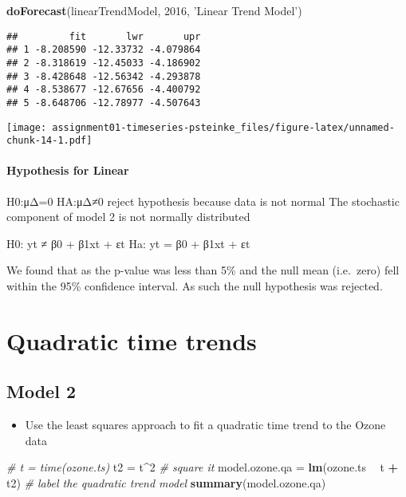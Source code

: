 \documentclass[]{article}
\newenvironment{Shaded}{\begin{snugshade}}{\end{snugshade}}
\newcommand{\CommentTok}[1]{\textcolor[rgb]{0.56,0.35,0.01}{\textit{#1}}}
\newcommand{\DecValTok}[1]{\textcolor[rgb]{0.00,0.00,0.81}{#1}}
\newcommand{\KeywordTok}[1]{\textcolor[rgb]{0.13,0.29,0.53}{\textbf{#1}}}
\newcommand{\NormalTok}[1]{#1}
\newcommand{\OperatorTok}[1]{\textcolor[rgb]{0.81,0.36,0.00}{\textbf{#1}}}
\newcommand{\StringTok}[1]{\textcolor[rgb]{0.31,0.60,0.02}{#1}}
\providecommand{\tightlist}{%
  \setlength{\itemsep}{0pt}\setlength{\parskip}{0pt}}
\let\oldparagraph\paragraph
\renewcommand{\paragraph}[1]{\oldparagraph{#1}\mbox{}}
\begin{document}
\begin{Shaded}
\begin{Highlighting}[]
\KeywordTok{doForecast}\NormalTok{(linearTrendModel, }\DecValTok{2016}\NormalTok{, }\StringTok{'Linear Trend Model'}\NormalTok{)}
\end{Highlighting}
\end{Shaded}

\begin{verbatim}
##         fit       lwr       upr
## 1 -8.208590 -12.33732 -4.079864
## 2 -8.318619 -12.45033 -4.186902
## 3 -8.428648 -12.56342 -4.293878
## 4 -8.538677 -12.67656 -4.400792
## 5 -8.648706 -12.78977 -4.507643
\end{verbatim}

\texttt{[image: assignment01-timeseries-psteinke\_files/figure-latex/unnamed-chunk-14-1.pdf]}

\hypertarget{hypothesis-for-linear}{%
\paragraph{Hypothesis for Linear}\label{hypothesis-for-linear}}

H0:μΔ=0 HA:μΔ≠0 reject hypothesis because data is not normal The
stochastic component of model 2 is not normally distributed

H0: yt ≠ β0 + β1xt + εt Ha: yt = β0 + β1xt + εt

We found that as the p-value was less than 5\% and the null mean
(i.e.~zero) fell within the 95\% confidence interval. As such the null
hypothesis was rejected.

\hypertarget{quadratic-time-trends}{%
\section{Quadratic time trends}\label{quadratic-time-trends}}

\hypertarget{model-2}{%
\subsection{Model 2}\label{model-2}}

\begin{itemize}
\tightlist
\item
  Use the least squares approach to fit a quadratic time trend to the
  Ozone data
\end{itemize}

\begin{Shaded}
\begin{Highlighting}[]
\CommentTok{# t = time(ozone.ts)}
\NormalTok{t2 =}\StringTok{ }\NormalTok{t}\OperatorTok{^}\DecValTok{2} \CommentTok{# square it}
\NormalTok{model.ozone.qa =}\StringTok{ }
\StringTok{  }\KeywordTok{lm}\NormalTok{(ozone.ts }\OperatorTok{~}\StringTok{ }\NormalTok{t }\OperatorTok{+}\StringTok{ }\NormalTok{t2) }\CommentTok{# label the quadratic trend model}
\KeywordTok{summary}\NormalTok{(model.ozone.qa)}
\end{Highlighting}
\end{Shaded}
\end{document}
